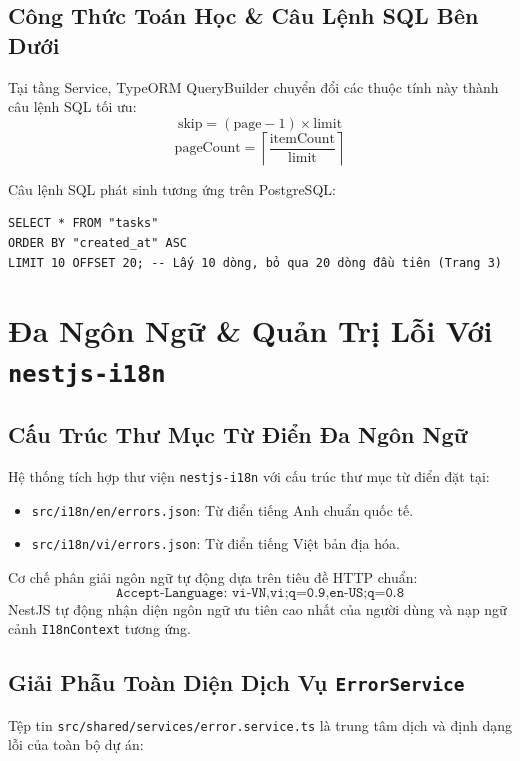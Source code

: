 \documentclass[12pt,a4paper,oneside]{book}
\begin{document}
\section{Công Thức Toán Học \& Câu Lệnh SQL Bên Dưới}
Tại tầng Service, TypeORM QueryBuilder chuyển đổi các thuộc tính này thành câu lệnh SQL tối ưu:
\begin{equation}
  \text{skip} = (\text{page} - 1) \times \text{limit}
\end{equation}
\begin{equation}
  \text{pageCount} = \left\lceil \frac{\text{itemCount}}{\text{limit}} \right\rceil
\end{equation}

Câu lệnh SQL phát sinh tương ứng trên PostgreSQL:
\begin{codebox}
\begin{Verbatim}[fontsize=\small]
SELECT * FROM "tasks"
ORDER BY "created_at" ASC
LIMIT 10 OFFSET 20; -- Lấy 10 dòng, bỏ qua 20 dòng đầu tiên (Trang 3)
\end{Verbatim}
\end{codebox}

\chapter{Đa Ngôn Ngữ \& Quản Trị Lỗi Với \texttt{nestjs-i18n}}

\section{Cấu Trúc Thư Mục Từ Điển Đa Ngôn Ngữ}
Hệ thống tích hợp thư viện \texttt{nestjs-i18n} với cấu trúc thư mục từ điển đặt tại:
\begin{itemize}
  \item \texttt{src/i18n/en/errors.json}: Từ điển tiếng Anh chuẩn quốc tế.
  \item \texttt{src/i18n/vi/errors.json}: Từ điển tiếng Việt bản địa hóa.
\end{itemize}

Cơ chế phân giải ngôn ngữ tự động dựa trên tiêu đề HTTP chuẩn:
\begin{equation}
  \texttt{Accept-Language: vi-VN,vi;q=0.9,en-US;q=0.8}
\end{equation}
NestJS tự động nhận diện ngôn ngữ ưu tiên cao nhất của người dùng và nạp ngữ cảnh \texttt{I18nContext} tương ứng.

\section{Giải Phẫu Toàn Diện Dịch Vụ \texttt{ErrorService}}
Tệp tin \texttt{src/shared/services/error.service.ts} là trung tâm dịch và định dạng lỗi của toàn bộ dự án:
\end{document}
